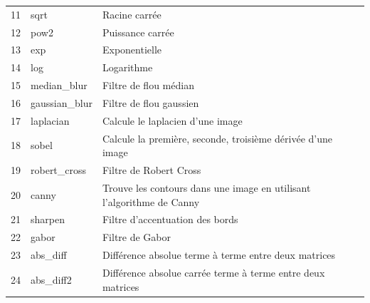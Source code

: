 \documentclass[a4paper,12pt]{report}
\begin{document}
\begin{longtable}{|c|l|P{6cm}|}
    11              & sqrt                             & Racine carrée                                                                                  \\
    12              & pow2                             & Puissance carrée                                                                               \\
    13              & exp                              & Exponentielle                                                                                  \\
    14              & log                              & Logarithme                                                                                     \\
    15              & median\_blur                     & Filtre de flou médian                                                                          \\
    16              & gaussian\_blur                   & Filtre de flou gaussien                                                                        \\
    17              & laplacian                        & Calcule le laplacien d'une image                                                               \\
    18              & sobel                            & Calcule la première, seconde, troisième dérivée d'une image                                    \\
    19              & robert\_cross                    & Filtre de Robert Cross                                                                         \\
    20              & canny                            & Trouve les contours dans une image en utilisant l'algorithme de Canny                          \\
    21              & sharpen                          & Filtre d'accentuation des bords                                                                \\
    22              & gabor                            & Filtre de Gabor                                                                                \\
    23              & abs\_diff                        & Différence absolue terme à terme entre deux matrices                                           \\
    24              & abs\_diff2                       & Différence absolue carrée terme à terme entre deux matrices                                    \\

\end{longtable}
\end{document}
